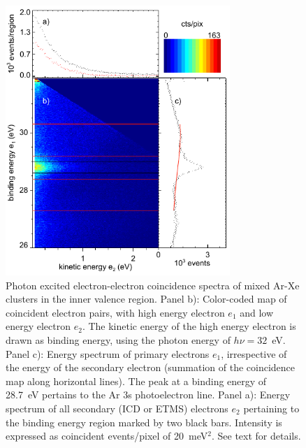 \begin{figure}[ht]
 \centering
 \includegraphics[width=8.5cm]{pics/figure_map.pdf}
 \caption{
Photon excited electron-electron coincidence spectra of mixed Ar-Xe clusters in the inner valence region. Panel b): Color-coded map of coincident electron pairs, with high energy electron $e_1$ and low energy electron $e_2$. The kinetic energy of the high energy electron is drawn as binding energy, using the photon energy of $h\nu = 32$~eV. Panel c): Energy spectrum of primary electrons $e_1$, irrespective of the energy of the secondary electron (summation of the coincidence map along horizontal lines). The peak at a binding energy of 28.7~eV pertains to the Ar 3s photoelectron line.  Panel a): Energy spectrum of all secondary (ICD or ETMS) electrons $e_2$ pertaining to the binding energy region marked by two black bars. Intensity is expressed as coincident events/pixel of 20~meV$^2$. See text for details.
}
 \label{figure:map}
\end{figure}

